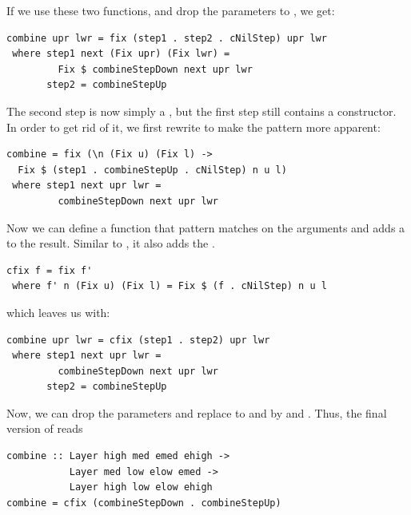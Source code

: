 \documentclass[preprint,natbib]{sigplanconf}
\begin{document}
If we use these two functions, and drop the parameters to , we get:

\begin{small}%
\begin{verbatim}
combine upr lwr = fix (step1 . step2 . cNilStep) upr lwr
 where step1 next (Fix upr) (Fix lwr) = 
         Fix $ combineStepDown next upr lwr
       step2 = combineStepUp
\end{verbatim}%
\end{small}

The second step is now simply a , but the first step still contains a  constructor. In order to get rid of it, we first rewrite  to make the pattern more apparent:

\begin{small}%
\begin{verbatim}
combine = fix (\n (Fix u) (Fix l) -> 
  Fix $ (step1 . combineStepUp . cNilStep) n u l) 
 where step1 next upr lwr = 
         combineStepDown next upr lwr
\end{verbatim}
\end{small}%

Now we can define a function  that pattern matches on the arguments and adds a  to the result. Similar to , it also adds the .

\begin{small}
\begin{verbatim}
cfix f = fix f' 
 where f' n (Fix u) (Fix l) = Fix $ (f . cNilStep) n u l
\end{verbatim}%
\end{small}

which leaves us with:

\begin{small}%
\begin{verbatim}
combine upr lwr = cfix (step1 . step2) upr lwr
 where step1 next upr lwr = 
         combineStepDown next upr lwr
       step2 = combineStepUp
\end{verbatim}
\end{small}


Now, we can drop the parameters and replace to  and  by  and . Thus, the final version of  reads

\begin{small}%
\begin{verbatim}
combine :: Layer high med emed ehigh ->
           Layer med low elow emed -> 
           Layer high low elow ehigh
combine = cfix (combineStepDown . combineStepUp)
\end{verbatim}
\end{small}
\end{document}
